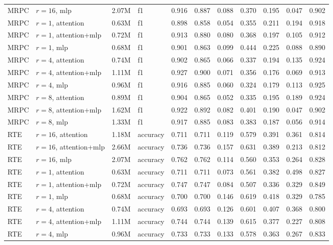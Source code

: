{\begin{longtable}{llrlrrrrrrr}
MRPC & $r=16$, mlp & 2.07M & f1 & 0.916 & 0.887 & 0.088 & 0.370 & 0.195 & 0.047 & 0.902 \\
MRPC & $r=1$, attention & 0.63M & f1 & 0.898 & 0.858 & 0.054 & 0.355 & 0.211 & 0.194 & 0.918 \\
MRPC & $r=1$, attention+mlp & 0.72M & f1 & 0.913 & 0.880 & 0.080 & 0.368 & 0.197 & 0.105 & 0.912 \\
MRPC & $r=1$, mlp & 0.68M & f1 & 0.901 & 0.863 & 0.099 & 0.444 & 0.225 & 0.088 & 0.890 \\
MRPC & $r=4$, attention & 0.74M & f1 & 0.902 & 0.865 & 0.066 & 0.337 & 0.194 & 0.135 & 0.924 \\
MRPC & $r=4$, attention+mlp & 1.11M & f1 & 0.927 & 0.900 & 0.071 & 0.356 & 0.176 & 0.069 & 0.913 \\
MRPC & $r=4$, mlp & 0.96M & f1 & 0.916 & 0.885 & 0.060 & 0.324 & 0.179 & 0.113 & 0.925 \\
MRPC & $r=8$, attention & 0.89M & f1 & 0.904 & 0.865 & 0.052 & 0.335 & 0.195 & 0.189 & 0.924 \\
MRPC & $r=8$, attention+mlp & 1.62M & f1 & 0.922 & 0.892 & 0.082 & 0.401 & 0.190 & 0.047 & 0.902 \\
MRPC & $r=8$, mlp & 1.33M & f1 & 0.917 & 0.885 & 0.083 & 0.383 & 0.187 & 0.056 & 0.914 \\
RTE & $r=16$, attention & 1.18M & accuracy & 0.711 & 0.711 & 0.119 & 0.579 & 0.391 & 0.361 & 0.814 \\
RTE & $r=16$, attention+mlp & 2.66M & accuracy & 0.736 & 0.736 & 0.157 & 0.631 & 0.389 & 0.213 & 0.812 \\
RTE & $r=16$, mlp & 2.07M & accuracy & 0.762 & 0.762 & 0.114 & 0.560 & 0.353 & 0.264 & 0.828 \\
RTE & $r=1$, attention & 0.63M & accuracy & 0.711 & 0.711 & 0.073 & 0.561 & 0.382 & 0.498 & 0.827 \\
RTE & $r=1$, attention+mlp & 0.72M & accuracy & 0.747 & 0.747 & 0.084 & 0.507 & 0.336 & 0.329 & 0.849 \\
RTE & $r=1$, mlp & 0.68M & accuracy & 0.700 & 0.700 & 0.146 & 0.619 & 0.418 & 0.329 & 0.785 \\
RTE & $r=4$, attention & 0.74M & accuracy & 0.693 & 0.693 & 0.126 & 0.601 & 0.407 & 0.368 & 0.800 \\
RTE & $r=4$, attention+mlp & 1.11M & accuracy & 0.744 & 0.744 & 0.139 & 0.615 & 0.377 & 0.227 & 0.808 \\
RTE & $r=4$, mlp & 0.96M & accuracy & 0.733 & 0.733 & 0.133 & 0.578 & 0.363 & 0.267 & 0.833 \\

\end{longtable}}
